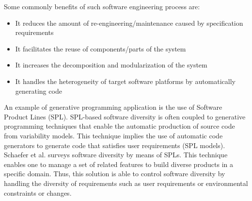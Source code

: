 Some commonly benefits of such software engineering process are:
\begin{itemize}
\item It reduces the amount of re-engineering/maintenance caused by specification requirements
\item It facilitates the reuse of components/parts of the system
\item It increases the decomposition and modularization of the system
\item It handles the heterogeneity of target software platforms by automatically generating code
\end{itemize}

An example of generative programming application is the use of Software Product Lines (SPL).
SPL-based software diversity is often coupled to generative programming techniques\cite{Czarnecki:2000:GPM:345203} that enable the automatic production of source code from variability models. This technique implies the use of automatic code generators to generate code that satisfies user requirements (SPL models).
Schaefer et al.\cite{schaefer2012software} surveys software diversity by means of SPLs. This technique enables one to manage a set of related features to build diverse products in a specific domain. Thus, this solution is able to control software diversity by handling the diversity of requirements such as user requirements or environmental constraints or changes. 



